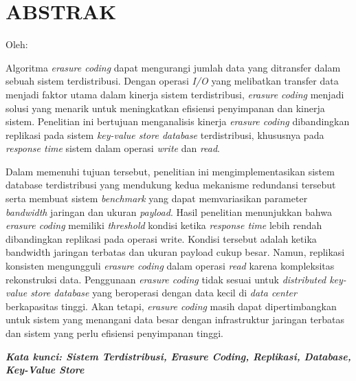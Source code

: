 \clearpage
\chapter*{ABSTRAK}

\begin{center}
  \center
  \begin{singlespace}
    \large\bfseries\MakeUppercase{\thetitle}
    
    \normalfont\normalsize
    Oleh:
    
    \bfseries \theauthor
  \end{singlespace}
\end{center}

\begin{singlespace}
  \small
  Algoritma \textit{erasure coding} dapat mengurangi jumlah data yang ditransfer dalam sebuah sistem terdistribusi. Dengan operasi \textit{I/O} yang melibatkan transfer data menjadi faktor utama dalam kinerja sistem terdistribusi, \textit{erasure coding} menjadi solusi yang menarik untuk meningkatkan efisiensi penyimpanan dan kinerja sistem. Penelitian ini bertujuan menganalisis kinerja \textit{erasure coding} dibandingkan replikasi pada sistem \textit{key-value store database} terdistribusi, khususnya pada \textit{response time} sistem dalam operasi \textit{write} dan \textit{read}.
  
  Dalam memenuhi tujuan tersebut, penelitian ini mengimplementasikan sistem database terdistribusi yang mendukung kedua mekanisme redundansi tersebut serta membuat sistem \textit{benchmark} yang dapat memvariasikan parameter \textit{bandwidth} jaringan dan ukuran \textit{payload}. Hasil penelitian menunjukkan bahwa \textit{erasure coding} memiliki \textit{threshold} kondisi ketika \textit{response time} lebih rendah dibandingkan replikasi pada operasi write. Kondisi tersebut adalah ketika bandwidth jaringan terbatas dan ukuran payload cukup besar. Namun, replikasi konsisten mengungguli \textit{erasure coding} dalam operasi \textit{read} karena kompleksitas rekonstruksi data. Penggunaan \textit{erasure coding} tidak sesuai untuk \textit{distributed key-value store database} yang beroperasi dengan data kecil di \textit{data center} berkapasitas tinggi. Akan tetapi, \textit{erasure coding} masih dapat dipertimbangkan untuk sistem yang menangani data besar dengan infrastruktur jaringan terbatas dan sistem yang perlu efisiensi penyimpanan tinggi.
  
  \textbf{\textit{Kata kunci: Sistem Terdistribusi, Erasure Coding, Replikasi, Database, Key-Value Store }}
  
\end{singlespace}
\clearpage